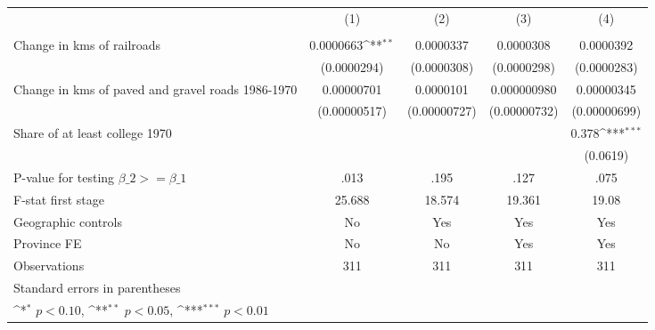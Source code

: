 {
\def\sym#1{\ifmmode^{#1}\else\(^{#1}\)\fi}
\begin{tabular}{l*{4}{c}}
\hline\hline
                &\multicolumn{1}{c}{(1)}&\multicolumn{1}{c}{(2)}&\multicolumn{1}{c}{(3)}&\multicolumn{1}{c}{(4)}\\
                &\multicolumn{1}{c}{}&\multicolumn{1}{c}{}&\multicolumn{1}{c}{}&\multicolumn{1}{c}{}\\
\hline
Change in kms of railroads&0.0000663\sym{**} &0.0000337         &0.0000308         &0.0000392         \\
                &(0.0000294)         &(0.0000308)         &(0.0000298)         &(0.0000283)         \\
[1em]
Change in kms of paved and gravel roads 1986-1970&0.00000701         &0.0000101         &0.000000980         &0.00000345         \\
                &(0.00000517)         &(0.00000727)         &(0.00000732)         &(0.00000699)         \\
[1em]
Share of at least college 1970&                  &                  &                  &    0.378\sym{***}\\
                &                  &                  &                  & (0.0619)         \\
\hline
P-value for testing $\beta\_{2} >= \beta\_{1}$&     .013         &     .195         &     .127         &     .075         \\
F-stat first stage&   25.688         &   18.574         &   19.361         &    19.08         \\
Geographic controls&       No         &      Yes         &      Yes         &      Yes         \\
Province FE     &       No         &       No         &      Yes         &      Yes         \\
Observations    &      311         &      311         &      311         &      311         \\
\hline\hline
\multicolumn{5}{l}{\footnotesize Standard errors in parentheses}\\
\multicolumn{5}{l}{\footnotesize \sym{*} \(p<0.10\), \sym{**} \(p<0.05\), \sym{***} \(p<0.01\)}\\
\end{tabular}
}
